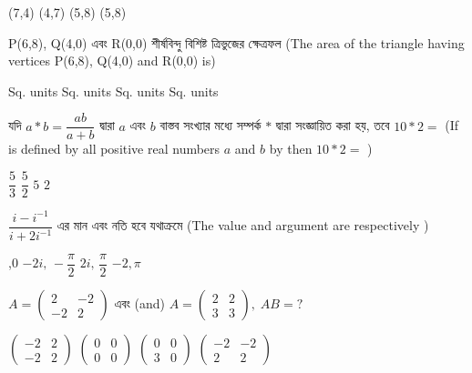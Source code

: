 \documentclass[addpoints]{exam}
\begin{document}
\begin{questions}
\begin{oneparchoices}
\choice (7,4)
\choice (4,7)
\choice (5,8)
\choice (5,8)
\end{oneparchoices}

\question P(6,8), Q(4,0) এবং R(0,0)  শীর্ষবিন্দু বিশিষ্ট ত্রিভুজের ক্ষেত্রফল (The area of the triangle having vertices  P(6,8), Q(4,0) and R(0,0) is)

\begin{oneparchoices}
 Sq. units
 Sq. units
 Sq. units
 Sq. units
\end{oneparchoices}

\question  যদি $ a*b = \dfrac{ab}{a+b} $ দ্বারা $ a $ এবং $ b $ বাস্তব সংখ্যার মধ্যে সম্পর্ক $ * $ দ্বারা সংজ্ঞায়িত করা হয়, তবে $ 10*2 = $ (If is defined by all positive real numbers $ a $ and $ b $ by then $ 10*2 = $ )

\begin{oneparchoices}
\choice $ \dfrac{5}{3} $
\choice $ \dfrac{5}{2} $
\choice $ 5 $
\choice $ 2 $

\end{oneparchoices}

\question   $ \dfrac{i-i^{-1}}{i+2i^{-1}} $ এর মান এবং নতি হবে যথাক্রমে (The value and argument are respectively ) 

\begin{oneparchoices}
,0
\choice $ -2i,\, -\dfrac{\pi}{2} $
\choice $ 2i,\, \dfrac{\pi}{2} $
\choice $ -2, \pi $

\end{oneparchoices}

\question  $ A = \begin{pmatrix} 2 & -2\\ -2 & 2 \end{pmatrix}$ এবং (and) $ A = \begin{pmatrix} 2 & 2\\ 3 & 3 \end{pmatrix},\; AB=?$

\begin{oneparchoices}
\choice  $\begin{pmatrix} -2 & 2\\ -2 & 2 \end{pmatrix}$
\choice  $\begin{pmatrix} 0 & 0\\ 0 & 0 \end{pmatrix}$
\choice  $\begin{pmatrix} 0 & 0\\ 3 & 0 \end{pmatrix}$
\choice  $\begin{pmatrix} -2 & -2\\ 2 & 2 \end{pmatrix}$
\end{oneparchoices}


\end{questions}
\end{document}
